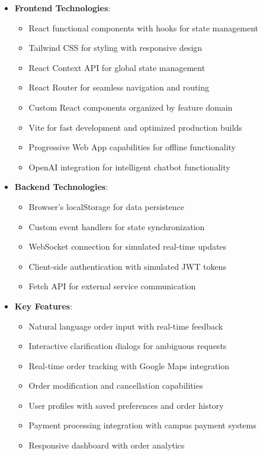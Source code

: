 \documentclass[12pt]{article}
\begin{document}
\begin{itemize}
    \item \textbf{Frontend Technologies}:
    \begin{itemize}
        \item React functional components with hooks for state management
        \item Tailwind CSS for styling with responsive design
        \item React Context API for global state management
        \item React Router for seamless navigation and routing
        \item Custom React components organized by feature domain
        \item Vite for fast development and optimized production builds
        \item Progressive Web App capabilities for offline functionality
        \item OpenAI integration for intelligent chatbot functionality
    \end{itemize}
    
    \item \textbf{Backend Technologies}:
    \begin{itemize}
        \item Browser's localStorage for data persistence
        \item Custom event handlers for state synchronization
        \item WebSocket connection for simulated real-time updates
        \item Client-side authentication with simulated JWT tokens
        \item Fetch API for external service communication
    \end{itemize}
    
    \item \textbf{Key Features}:
    \begin{itemize}
        \item Natural language order input with real-time feedback
        \item Interactive clarification dialogs for ambiguous requests
        \item Real-time order tracking with Google Maps integration
        \item Order modification and cancellation capabilities
        \item User profiles with saved preferences and order history
        \item Payment processing integration with campus payment systems
        \item Responsive dashboard with order analytics
    \end{itemize}
\end{itemize}
\end{document}
